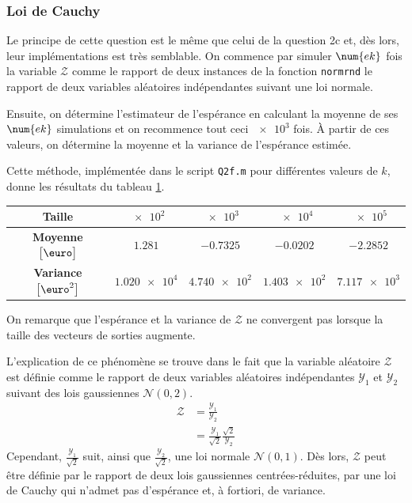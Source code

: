 \documentclass[a4paper, 12pt]{article}
\begin{document}
		\subsubsection*{Loi de Cauchy}
		Le principe de cette question est le même que celui de la question 2c et, dès lors, leur implémentations est très semblable. On commence par simuler $\num{ek}$ fois la variable $\mathcal{Z}$ comme le rapport de deux instances de la fonction \texttt{normrnd} \cad le rapport de deux variables aléatoires indépendantes suivant une loi normale. \par
		Ensuite, on détermine l'estimateur de l'espérance en calculant la moyenne de ses $\num{ek}$ simulations et on recommence tout ceci $\num{e3}$ fois. \`{A} partir de ces valeurs, on détermine la moyenne et la variance de l'espérance estimée. \par
		Cette méthode, implémentée dans le script \texttt{Q2f.m} pour différentes valeurs de $k$, donne les résultats du tableau \ref{table Q2f}.
		\begin{table}[H]
			\centering
			\begin{tabular}{|c|c|c|c|c|}
				\hline
				              \textbf{Taille}                &   $\num{e2}$    &   $\num{e3}$    &   $\num{e4}$    &   $\num{e5}$    \\ \hline\hline
				 \textbf{Moyenne} $\big[\text{\euro}\big]$   &  $\num{1.281}$  & $\num{-0.7325}$ & $\num{-0.0202}$ & $\num{-2.2852}$ \\ \hline
				\textbf{Variance} $\big[\text{\euro}^2\big]$ & $\num{1.020e4}$ & $\num{4.740e2}$ & $\num{1.403e2}$ & $\num{7.117e3}$ \\ \hline
			\end{tabular}
			\label{table Q2f}
		\end{table}
		On remarque que l'espérance et la variance de $\mathcal{Z}$ ne convergent pas lorsque la taille des vecteurs de sorties augmente. \par
		L'explication de ce phénomène se trouve dans le fait que la variable aléatoire $\mathcal{Z}$ est définie comme le rapport de deux variables aléatoires indépendantes $\mathcal{Y}_1$ et $\mathcal{Y}_2$ suivant des lois gaussiennes $\mathcal{N}\left(0,2\right)$.
		\begin{align*}
			\mathcal{Z} & = \frac{\mathcal{Y}_1}{\mathcal{Y}_2} \\
			& = \frac{\mathcal{Y}_1}{\sqrt{2}}\frac{\sqrt{2}}{\mathcal{Y}_2}
		\end{align*}
		Cependant, $\frac{\mathcal{Y}_1}{\sqrt{2}}$ suit, ainsi que $\frac{\mathcal{Y}_2}{\sqrt{2}}$, une loi normale $\mathcal{N}\left(0,1\right)$. 
		Dès lors, $\mathcal{Z}$ peut être définie par le rapport de deux lois gaussiennes centrées-réduites, \cad par une loi de Cauchy qui n'admet pas d'espérance et, à fortiori, de variance.
	\newpage
	\appendix
\end{document}
